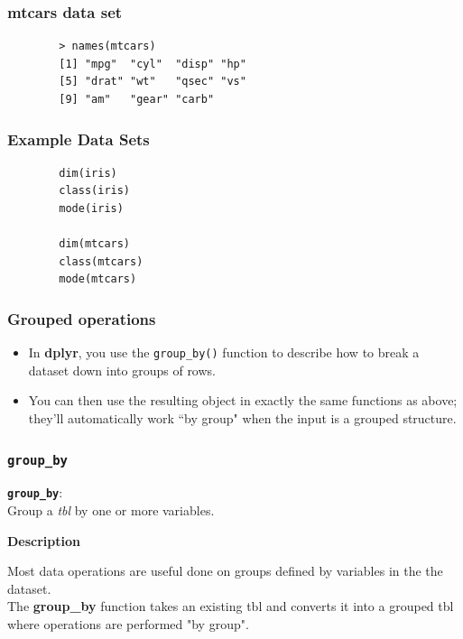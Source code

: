 \documentclass{beamer}
\begin{document}
	\begin{frame}[fragile]
		
		\frametitle{mtcars data set}
		\Large
		\begin{framed}
		\begin{verbatim}
		> names(mtcars)
		[1] "mpg"  "cyl"  "disp" "hp"  
		[5] "drat" "wt"   "qsec" "vs"  
		[9] "am"   "gear" "carb"
		\end{verbatim}
		\end{framed}
	\end{frame}
	\begin{frame}[fragile]
		\frametitle{Example Data Sets}
		\large
		\begin{framed}
		\begin{verbatim}
		dim(iris)
		class(iris)
		mode(iris)
		
		dim(mtcars)
		class(mtcars)
		mode(mtcars)
		\end{verbatim}
		\end{framed}
	\end{frame}
		\begin{frame}
			\frametitle{Grouped operations}
			\Large
			\begin{itemize}
				
				\item In \textbf{dplyr}, you use the \texttt{group\_by()} function to describe how to break a dataset down into groups of rows. \bigskip
				\item You can then use the resulting object in exactly the same functions as above; they’ll automatically work ``by group" when the input is a grouped structure.
			\end{itemize}
		\end{frame}
		\begin{frame}
			
			\frametitle{\texttt{group\_by }}
			{
			\Large
			\textbf{\texttt{group\_by}}:\\ \bigskip
		}
		\large
			Group a \textit{tbl} by one or more variables.\\ \bigskip
			
			
			\textbf{Description}\\ \bigskip
			
			Most data operations are useful done on groups defined by variables in the the dataset. \\ The
			\textbf{group\_by} function takes an existing tbl and converts it into a grouped tbl where operations are
			performed "by group".
			
		\end{frame}
\end{document}
